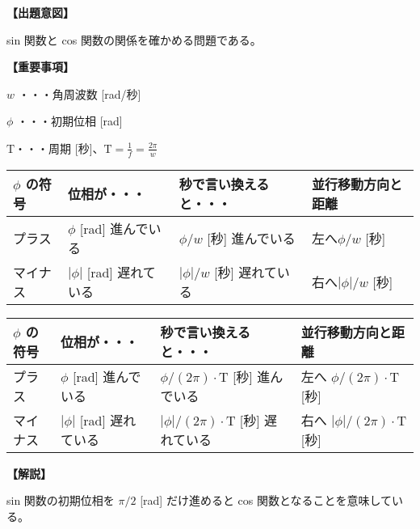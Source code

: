 \noindent \textbf{【出題意図】}

\noindent sin 関数と cos 関数の関係を確かめる問題である。

\vspace{1em}
\noindent \textbf{【重要事項】}

\bigskip
\noindent $w$ ・・・角周波数 [rad/秒]

\bigskip
\noindent $\phi$ ・・・初期位相 [rad]

\bigskip
$\textrm{T}$・・・周期 [秒]、$\textrm{T} = \frac{1}{f} = \frac{2\pi}{w}$

\begin{center}
\begin{tabularx}{0.9\fbwidth}{|X|X|X|X|}
\hline
$\phi$ の符号&  位相が・・・   & 秒で言い換えると・・・   & 並行移動方向と距離 \\
\hline
プラス &  $\phi$ [rad] 進んでいる & $\phi/w$ [秒] 進んでいる & 左へ$\phi/w$ [秒] \\
\hline
マイナス &  $|\phi|$ [rad] 遅れている & $|\phi|/w$ [秒] 遅れている & 右へ$|\phi|/w$ [秒] \\
\hline
\end{tabularx}

\medskip
\begin{tabularx}{0.9\fbwidth}{|X|X|X|X|}
\hline
$\phi$ の符号&  位相が・・・   & 秒で言い換えると・・・   & 並行移動方向と距離 \\
\hline
プラス &  $\phi$ [rad] 進んでいる & $\phi/(2\pi) \cdot \textrm{T}$ [秒] 進んでいる & 左へ $\phi/(2\pi) \cdot \textrm{T}$ [秒] \\
\hline
マイナス &  $|\phi|$ [rad] 遅れている & $|\phi|/(2\pi) \cdot \textrm{T}$ [秒] 遅れている & 右へ $|\phi|/(2\pi) \cdot \textrm{T}$ [秒] \\
\hline
\end{tabularx}
\end{center}

\vspace{1em}
\noindent \textbf{【解説】}

\noindent sin 関数の初期位相を $\pi/2$ [rad] だけ進めると cos 関数となることを意味している。
